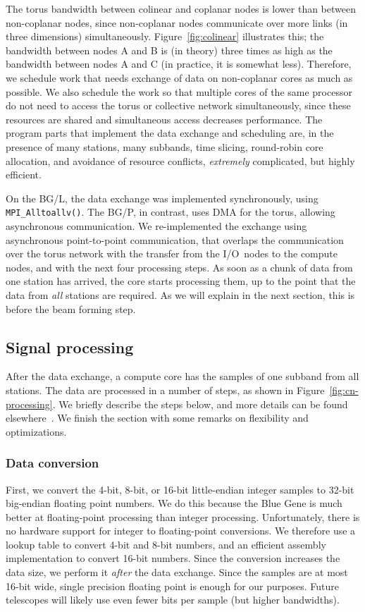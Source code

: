 \documentclass{sig-alternate}
\begin{document}
The torus bandwidth between colinear and coplanar nodes is lower than between
non-coplanar nodes, since non-coplanar nodes communicate over more links
(in three dimensions) simultaneously.
Figure~\ref{fig:colinear} illustrates this; the bandwidth between nodes
\textsf{A} and \textsf{B} is (in theory) three times as high as the bandwidth
between nodes \textsf{A} and \textsf{C} (in practice, it is somewhat less).
Therefore, we schedule work that needs exchange of data 
on non-coplanar cores as much as possible.
We also schedule the work so that multiple cores of the same processor do not
need to access the torus or collective network simultaneously, since these
resources are shared and simultaneous access decreases performance.
The program parts that implement the data exchange and scheduling are, in the
presence of many stations, many subbands, time slicing, round-robin core
allocation, and avoidance of resource conflicts, \emph{extremely\/}
complicated, but highly efficient.

On the BG/L, the data exchange was implemented synchronously, using
\texttt{MPI\_Alltoallv()}.
The BG/P, in contrast, uses DMA for the torus, allowing asynchronous
communication.
We re-implemented the exchange using asynchronous point-to-point
communication, that overlaps the communication over the torus network with 
the transfer from the I/O~nodes to the compute nodes, and with
the next four processing steps.
As soon as a chunk of data from one station has arrived, the core starts
processing them, up to the point that the data from \emph{all\/} stations
are required. As we will explain in the next section, this is before the beam forming 
step.


\subsection{Signal processing}
\label{sec:signal-processing}

After the data exchange, a compute core has the samples of one subband
from all stations.
The data are processed in a number of steps, as shown in Figure~\ref{fig:cn-processing}.
We briefly describe the steps below, and more details can be found elsewhere~\cite{Romein:06}.
We finish the section with some remarks on flexibility and optimizations.


\subsubsection{Data conversion}
First, we convert the 4-bit, 8-bit, or 16-bit little-endian integer
samples to 32-bit big-endian floating point numbers.  We do this
because the Blue Gene is much better at floating-point processing than
integer processing.  Unfortunately, there is no hardware support
for integer to floating-point conversions.  We therefore use a lookup
table to convert 4-bit and 8-bit numbers, and an efficient assembly
implementation to convert 16-bit numbers.
Since the conversion increases the data size, we perform it \emph{after\/} the
data exchange.
Since the samples are at most 16-bit wide, single precision floating
point is enough for our purposes. Future telescopes will likely use
even fewer bits per sample (but higher bandwidths).
\end{document}
